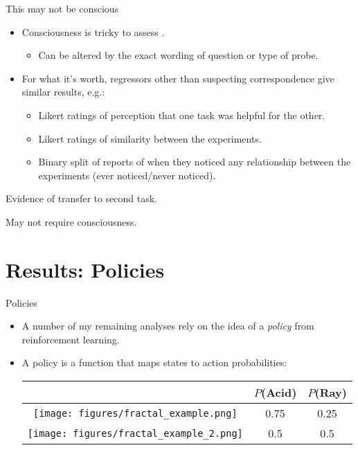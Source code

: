 \documentclass{beamer}
\begin{document}
\begin{frame}{This may not be conscious}
\begin{itemize}
\item Consciousness is tricky to assess \citep{Newell2014}.
    \begin{itemize}
    \item<2-> Can be altered by the exact wording of question or type of probe.
    \end{itemize}
\item<3-> For what it's worth, regressors other than suspecting correspondence give similar results, e.g.:
    \begin{itemize}
    \item<4-> Likert ratings of perception that one task was helpful for the other. 
    \item<5-> Likert ratings of similarity between the experiments.
    \item<6-> Binary split of reports of when they noticed any relationship between the experiments (ever noticed/never noticed).
    \end{itemize}
\end{itemize}
\end{frame}

\begin{frame}[standout]
Evidence of transfer to second task. \par
{} {
May not require consciousness.
}
\end{frame}

\section{Results: Policies}

\begin{frame}{Policies}
\begin{itemize}
\item A number of my remaining analyses rely on the idea of a \emph{policy} from reinforcement learning.
\item<2-> A policy is a function that maps states to action probabilities:
\begin{center}
\begin{table}

\begin{tabular}{|c|c|c|}
\hline 
& \(P\)(Acid) & \(P\)(Ray) \\
\hline
\texttt{[image: figures/fractal\_example.png]} & 0.75 & 0.25\\ \hline
\texttt{[image: figures/fractal\_example\_2.png]} & 0.5 & 0.5 \\ \hline
\end{tabular}
\end{table}
\end{center}
\end{itemize}
\end{frame}
\end{document}
